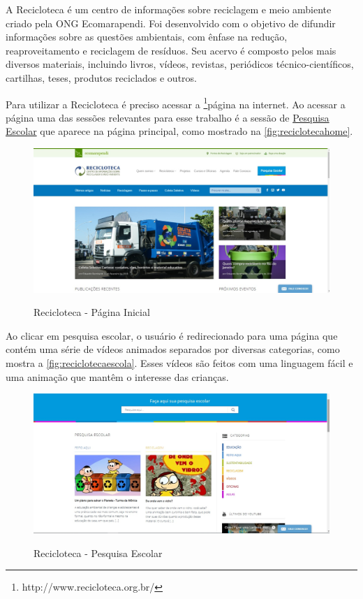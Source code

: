 \documentclass[
	12pt,				%
	openany,			%
	twoside,			%
	a4paper,			%
	english,			%
	french,				%
	spanish,			%
	brazil				%
	]{abntex2}
\begin{document}
A Recicloteca é um centro de informações sobre reciclagem e meio ambiente criado pela ONG Ecomarapendi. Foi desenvolvido com o objetivo de difundir informações sobre as questões ambientais, com ênfase na redução, reaproveitamento e reciclagem de resíduos. Seu acervo é composto pelos mais diversos materiais, incluindo livros, vídeos, revistas, periódicos técnico-científicos, cartilhas, teses, produtos reciclados e outros.

Para utilizar a Recicloteca é preciso acessar a \footnote{http://www.recicloteca.org.br/}{página} na internet. Ao acessar a página uma das sessões relevantes para esse trabalho é a sessão de \href{http://www.recicloteca.org.br/pesquisa/}{Pesquisa Escolar} que aparece na página principal, como mostrado na \autoref{fig:reciclotecahome}.

\begin{figure}[h]
\centering
   \caption{Recicloteca - Página Inicial}
   \includegraphics[scale=0.40]{media/reciclotecahome.jpg}
     \label{fig:reciclotecahome}
\end{figure}

Ao clicar em pesquisa escolar, o usuário é redirecionado para uma página que contém uma série de vídeos animados separados por diversas categorias, como mostra a \autoref{fig:reciclotecaescola}. Esses vídeos são feitos com uma linguagem fácil e uma animação que mantêm o interesse das crianças.

\begin{figure}[h]
\centering
   \caption{Recicloteca - Pesquisa Escolar}
   \includegraphics[scale=0.40]{media/reciclotecaescola.jpg}
     \label{fig:reciclotecaescola}
\end{figure}
\end{document}
